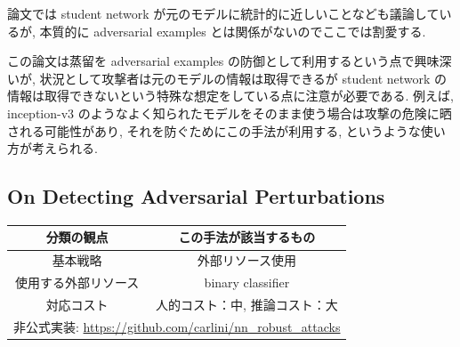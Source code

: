 論文では student network が元のモデルに統計的に近しいことなども議論しているが, 本質的に adversarial examples とは関係がないのでここでは割愛する.

この論文は蒸留を adversarial examples の防御として利用するという点で興味深いが, 状況として攻撃者は元のモデルの情報は取得できるが student network の情報は取得できないという特殊な想定をしている点に注意が必要である.
例えば, inception-v3 \cite{szegedy2016rethinking} のようなよく知られたモデルをそのまま使う場合は攻撃の危険に晒される可能性があり, それを防ぐためにこの手法が利用する, というような使い方が考えられる.



\subsection{On Detecting Adversarial Perturbations}
\label{subsec:on-detecting}
%
\begin{table}[htbp]
\begin{center}
\begin{tabular}{|c|c|}
\hline
分類の観点 & この手法が該当するもの \\
\hline
基本戦略 & 外部リソース使用 \\
使用する外部リソース & binary classifier \\
対応コスト & 人的コスト：中, 推論コスト：大 \\
\hline
\multicolumn{2}{|c|}{非公式実装: \href{https://github.com/carlini/nn_robust_attacks}{https://github.com/carlini/nn\_robust\_attacks}} \\
\hline
\end{tabular}
\label{tb:on-detecting-summary}
\end{center}
\end{table}
%

